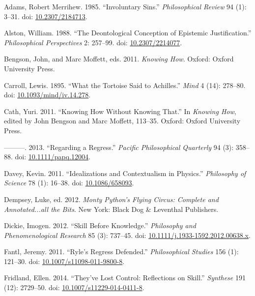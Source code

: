 \documentclass[
  10pt,
  letterpaper,
  DIV=11,
  numbers=noendperiod,
  twoside]{scrartcl}
\newlength{\cslhangindent}
\newenvironment{CSLReferences}[2] %
 {\begin{list}{}{%
  \setlength{\itemindent}{0pt}
  \setlength{\leftmargin}{0pt}
  \setlength{\parsep}{0pt}
  \ifodd #1
   \setlength{\leftmargin}{\cslhangindent}
   \setlength{\itemindent}{-1\cslhangindent}
  \fi
  \setlength{\itemsep}{#2\baselineskip}}}
 {\end{list}}
\begin{document}
\label{refs}
\begin{CSLReferences}{1}{0}
Adams, Robert Merrihew. 1985. {``Involuntary Sins.''}
\emph{Philosophical Review} 94 (1): 3--31. doi:
\href{https://doi.org/10.2307/2184713}{10.2307/2184713}.

Alston, William. 1988. {``The Deontological Conception of Epistemic
Justification.''} \emph{Philosophical Perspectives} 2: 257--99. doi:
\href{https://doi.org/10.2307/2214077}{10.2307/2214077}.

Bengson, John, and Marc Moffett, eds. 2011. \emph{Knowing How}. Oxford:
Oxford University Press.

Carroll, Lewis. 1895. {``What the Tortoise Said to Achilles.''}
\emph{Mind} 4 (14): 278--80. doi:
\href{https://doi.org/10.1093/mind/iv.14.278}{10.1093/mind/iv.14.278}.

Cath, Yuri. 2011. {``Knowing How Without Knowing That.''} In
\emph{Knowing How}, edited by John Bengson and Marc Moffett, 113--35.
Oxford: Oxford University Press.

---------. 2013. {``Regarding a Regress.''} \emph{Pacific Philosophical
Quarterly} 94 (3): 358--88. doi:
\href{https://doi.org/10.1111/papq.12004}{10.1111/papq.12004}.

Davey, Kevin. 2011. {``Idealizations and Contextualism in Physics.''}
\emph{Philosophy of Science} 78 (1): 16--38. doi:
\href{https://doi.org/10.1086/658093}{10.1086/658093}.

Dempsey, Luke, ed. 2012. \emph{Monty Python's Flying Circus: Complete
and Annotated...all the Bits}. New York: Black Dog \& Leventhal
Publishers.

Dickie, Imogen. 2012. {``Skill Before Knowledge.''} \emph{Philosophy and
Phenomenological Research} 85 (3): 737--45. doi:
\href{https://doi.org/10.1111/j.1933-1592.2012.00638.x}{10.1111/j.1933-1592.2012.00638.x}.

Fantl, Jeremy. 2011. {``Ryle's Regress Defended.''} \emph{Philosophical
Studies} 156 (1): 121--30. doi:
\href{https://doi.org/10.1007/s11098-011-9800-8}{10.1007/s11098-011-9800-8}.

Fridland, Ellen. 2014. {``They've Lost Control: Reflections on Skill.''}
\emph{Synthese} 191 (12): 2729--50. doi:
\href{https://doi.org/10.1007/s11229-014-0411-8}{10.1007/s11229-014-0411-8}.


\end{CSLReferences}
\end{document}

